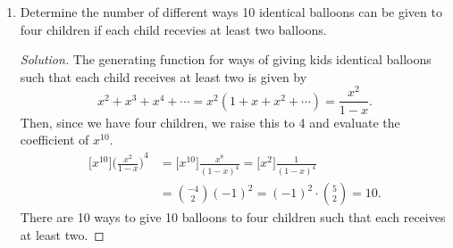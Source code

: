 \documentclass{article}
\newenvironment{solution}
  {\renewcommand\qedsymbol{$\blacksquare$}\begin{proof}[Solution]}
  {\end{proof}}
\begin{document}
\begin{enumerate}
\begin{solution}
        Here, we just follow the same procedure as above. The generating function for rolling a 10-sided die is given by\[
            x + x^2 + x^3 + \cdots x^{10} = x(1 + x + x^2 + \cdots x^9) = \frac{x(1-x^{10})}{1-x}.          
        \] We raise this to 4 since there are four distinct dice. Then, we evaluate the coefficient of $x^{24}$.\begin{align*} 
            \big[x^{24}\big] {\bigg(\frac{x(1-x^{10})}{1-x}\bigg)}^4 &= \big[x^{24}\big] \frac{x^4{(1-x^{10})}^4}{{(1-x)}^4} = \big[x^{20}\big] \frac{{(1-x^{10})}^4}{{(1-x)}^4} \\ 
            &= \big[x^{20}\big] \frac{1-4x^{10}+6x^{20}-4x^{30}+ x^{40}}{{(1-x)}^4}.
            \intertext{Here, we can cheat and cancel out the terms where $x^{24}$ won't appear.}
            &= \big[x^{20}\big] \frac{1}{{(1-x)}^4} - 4 \cdot \big[x^{10}\big] \frac{1}{{(1-x)}^4} + 6\cdot \big[x^{0}\big] \frac{1}{{(1-x)}^4} \\ 
            &= \binom{-4}{20} {(-1)}^{20} - 4 \cdot \binom{-4}{10} {(-1)}^{10} + 6\cdot \binom{-4}{0} {(-1)}^6 \\
            &= {(-1)}^{20} \cdot \binom{23}{20} - 4 \cdot {(-1)}^{10}\cdot \binom{13}{10} + 6\cdot {(-1)}^0 \binom{3}{0} = 633. 
        \end{align*} Therefore, there are 633 ways to roll a 24 with four 10-sided dice. 
    \end{solution} 
    \item Determine the number of different ways 10 identical balloons can be given to four children if each child recevies at least two balloons.\begin{solution} 
        The generating function for ways of giving kids identical balloons such that each child receives at least two is given by\[
            x^2 + x^3 + x^4 + \cdots = x^2 (1+ x + x^2 + \cdots) = \frac{x^2}{1-x}.     
        \] Then, since we have four children, we raise this to 4 and evaluate the coefficient of $x^{10}$.\begin{align*} 
            \big[x^{10}\big] {\bigg(\frac{x^2}{1-x}\bigg)}^4 &= \big[x^{10}\big] \frac{x^8}{{(1-x)}^4} = \big[x^2\big] \frac{1}{{(1-x)}^4} \\
            &= \binom{-4}{2} {(-1)}^2 = {(-1)}^2 \cdot \binom{5}{2} = 10. 
        \end{align*} There are 10 ways to give 10 balloons to four children such that each receives at least two. 
    \end{solution}
    \begin{minipage}[t]{.14\textwidth}

\end{minipage}
\end{enumerate}
\end{document}
